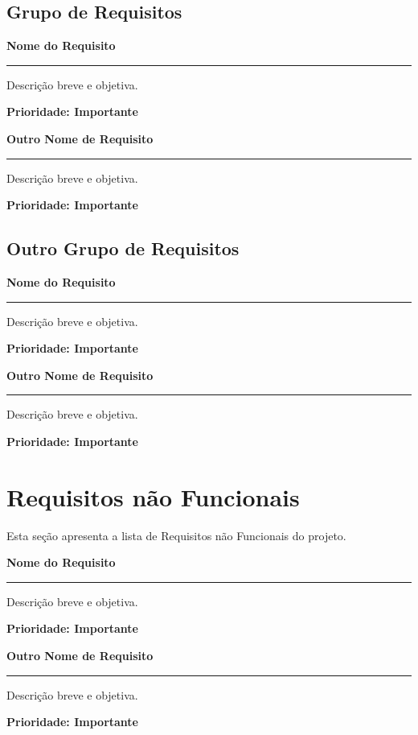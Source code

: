 \documentclass{article}
\begin{document}
  \subsection{Grupo de Requisitos}
  
    \begin{functional}
     \item \textbf{Nome do Requisito}\hrule
     Descrição breve e objetiva.

     \textbf{Prioridade: Importante}

     \item \textbf{Outro Nome de Requisito}\hrule
     Descrição breve e objetiva.
     
     \textbf{Prioridade: Importante}     

    \end{functional}

  \subsection{Outro Grupo de Requisitos}
  
    \begin{functional}
     \item \textbf{Nome do Requisito}\hrule
     Descrição breve e objetiva.

     \textbf{Prioridade: Importante}

     \item \textbf{Outro Nome de Requisito}\hrule
     Descrição breve e objetiva.
     
     \textbf{Prioridade: Importante}     

    \end{functional}    
 
\section{Requisitos não Funcionais}
Esta seção apresenta a lista de Requisitos não Funcionais do projeto.

  \begin{nonfunctional}
    \setcounter{enumi}{0} %
     \item \textbf{Nome do Requisito}\hrule
     Descrição breve e objetiva.

     \textbf{Prioridade: Importante}

     \item \textbf{Outro Nome de Requisito}\hrule
     Descrição breve e objetiva.
     
     \textbf{Prioridade: Importante}
  \end{nonfunctional}
\end{document}
